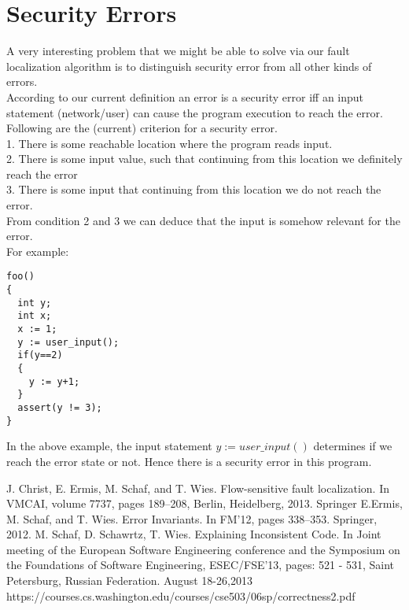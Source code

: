 \documentclass{article}
\begin{document}
\section{Security Errors}
A very interesting problem that we might be able to solve via our fault localization algorithm is to distinguish security error from all other kinds of errors. \\
According to our current definition an error is a security error iff an input statement (network/user) can cause the program execution to reach the error. Following are the (current) criterion for a security error.\\
1. There is some reachable location where the program reads input.\\
2. There is some input value, such that continuing from this location we definitely reach
the error\\
3. There is some input that continuing from this location we do not reach the error.
\\
From condition 2 and 3 we can deduce that the input is somehow relevant for the error.\\
For example:
\begin{lstlisting}
foo()
{
  int y;
  int x;
  x := 1;
  y := user_input();
  if(y==2) 
  {
    y := y+1;
  }
  assert(y != 3);
}
\end{lstlisting}
In the above example, the input statement $y := user\_input()$ determines if we reach the error state or not. Hence there is a security error in this program.



\begin{thebibliography}{9}
J. Christ, E. Ermis, M. Schaf, and T. Wies. Flow-sensitive fault localization. In VMCAI, volume 7737, pages 189–208, Berlin, Heidelberg, 2013. Springer
E.Ermis, M. Schaf, and T. Wies. Error Invariants. In FM’12, pages 338–353. Springer, 2012.
M. Schaf, D. Schawrtz, T. Wies. Explaining Inconsistent Code. In Joint meeting of the European Software Engineering conference and the Symposium on the Foundations of Software Engineering, ESEC/FSE’13, pages: 521 - 531, Saint Petersburg, Russian Federation. August 18-26,2013  
https://courses.cs.washington.edu/courses/cse503/06sp/correctness2.pdf


\end{thebibliography}
\end{document}
